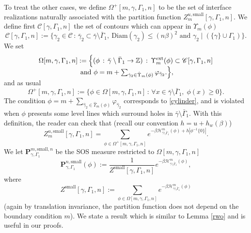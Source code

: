 \documentclass[JEP,XML,SOM,Unicode, NoFloatCountersInSection]{cedram}
\let\mathcal\mathscr
\newcommand{\sep}{\,:\,}
\numberwithin{equation}{section}
\theoremstyle{plain}
\theoremstyle{definition}
\newcommand{\ext}{\mathrm{ext}}
\newcommand{\sm}{\mathrm{small}}
\newcommand{\Diam}{\mathrm{Diam}}
\newcommand{\cH}{{\ensuremath{\mathcal H}} }
\newcommand{\cC}{{\ensuremath{\mathcal C}} }
\newcommand{\bP}{{\ensuremath{\mathbf P}} }
\newcommand{\bbZ}{{\ensuremath{\mathbb Z}} }
\newcommand{\gb}{\beta}
\newcommand{\gG}{\Gamma}
\newcommand{\gO}{\Omega}
\begin{document}
To treat the other cases, we define $\gO^+[m,\gamma,\gG_1,n]$ to be the set of interface realizations naturally associated with the partition function
$Z^{u,\sm}_m[\gamma,\gG_1,n]$.
We define first $\cC[\gamma,\gG_1,n]$ the set of contours which can appear in $\Upsilon_m(\phi)$
\begin{equation*}
\cC[\gamma,\gG_1,n]:=\{ \gamma_2\in \cC \sep \bar \gamma_2\subset \bar \gamma\setminus \bar \gG_1,\ \Diam(\gamma_2)\le (n\gb)^2 \text{ and }
\gamma_2 \mid \left(\{\gamma\} \cup \gG_1\right) \}.
\end{equation*}
We set\vspace*{-7pt}%
\begin{multline*}
\gO[m,\gamma,\gG_1,n]:=\Big\{ (\phi \sep \bar \gamma \setminus \bar \gG_1 \rightarrow \bbZ) \sep \Upsilon^{\ext}_m(\phi)\subset \cC[\gamma,\gG_1,n]
\\[-5pt]
\text{ and } \phi= m+ \textstyle\sum_{\hat \gamma_2 \in \hat \Upsilon_m(\phi)} \varphi_{\hat \gamma_2}. \Big\},\vspace*{-7pt}
\end{multline*}
and as usual
\begin{equation*}
\gO^+[m,\gamma,\gG_1,n]:= \Big\{ \phi\in \gO[m,\gamma,\gG_1,n] \sep \forall x\in \bar \gamma \setminus \bar \gG_1,\; \phi(x)\ge 0 \Big\}.
\end{equation*}
The condition $\phi= m+ \sum_{\hat \gamma_2 \in \hat \Upsilon_m(\phi)} \varphi_{\hat \gamma_2}$ corresponds to \eqref{cylinder}, and is violated when $\phi$ presents some level lines which surround holes in $\bar \gamma \setminus \bar \gG_1$.
With this definition, the reader can check that (recall our convention $h=u+h_w(\gb)$)
\begin{equation}\label{winouze}
Z^{u,\sm}_{m}[\gamma,\Gamma_1,n]= \sum_{\phi \in \gO^+[m,\gamma,\gG_1,n]}e^{-\gb \cH^m_{\bar \gamma \setminus \bar \gG_1}(\phi)+h|\phi^{-1}\{0\}|}.
\end{equation}
We let $\bP^{m,\sm,n}_{\gamma,\gG_1}$ be the SOS measure restricted to $\gO[m,\gamma,\gG_1,n]$
\begin{equation*}
\bP^{n,\sm}_{\gamma,\gG_1}(\phi):=\frac{1}{Z^{\sm}[\gamma,\gG_1,n]}e^{-\gb \cH^m_{\bar \gamma \setminus \bar \gG_1}(\phi)},
\end{equation*}
where
\begin{equation*}
Z^{\sm}[\gamma,\gG_1,n]:= \sum_{\phi \in \gO[m,\gamma,\gG_1,n]} e^{-\gb \cH^m_{\bar \gamma \setminus \bar \gG_1}(\phi)}
\end{equation*}
(again by translation invariance, the partition function does not depend on the boundary condition $m$).
We state a result which is similar to Lemma \ref{rwo} and is useful in our proofs.
\end{document}
